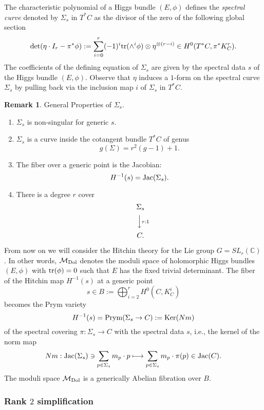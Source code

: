 \documentclass[oneside, 11pt]{amsart}
\theoremstyle{definition}
\newtheorem{rem}[thm]{Remark}
\numberwithin{equation}{subsection}
\def\tr{{\text{\rm{tr}}}}
\def\Ker{{\text{\rm{Ker}}}}
\def\Jac{{\text{\rm{Jac}}}}
\def\Jac{{\text{\rm{Jac}}}}
\def\Prym{{\text{\rm{Prym}}}}
\def\Dol{{\text{\rm{Dol}}}}
\newcommand{\be}{\begin{equation}}
\newcommand{\ee}{\end{equation}}
\newcommand{\rar}{\rightarrow}
\newcommand{\lrar}{\longrightarrow}
\begin{document}
The characteristic polynomial of a Higgs bundle
$(E,\phi)$  defines the \textit{spectral curve}  denoted by $\Sigma_s$ in $T^*C$ as the divisor of the zero of the following
global section
\be \label{spectral}
\det(\eta\cdot I_r-\pi^*\phi):=\sum_{i=0}^r (-1)^i \tr(\wedge^i \phi)\otimes \eta^{\otimes(r-i)}\in H^0(T^*C, \pi^*K_C^r).
\ee
The coefficients of the 
defining equation
of $\Sigma_s$ are given by the spectral data $s$ of the Higgs bundle $(E,\phi)$. Observe that $\eta$ induces a $1$-form on the spectral curve $\Sigma_s$ by pulling back via the inclusion map $i$ of $\Sigma_s$ in $T^*C$.


\begin{rem}
General Properties of $\Sigma_s$.
\begin{enumerate}
\item $\Sigma_s$ is non-singular for generic $s$.
\item
 $\Sigma_s$ is a curve inside the cotangent bundle $T^\ast C$ of genus 
$$g(\Sigma)=r^2(g-1)+1.$$
\item
The fiber over a generic point is the Jacobian:
$$H^{-1}(s)=\Jac(\Sigma_s).$$
\item
There is a degree $r$ cover
$$
\begin{CD}
\;\Sigma_s
\\
@VV{r:1}V
\\
\;C.
\end{CD}
$$

\end{enumerate}
\end{rem}

From now on we will consider the  Hitchin theory for the Lie group $G=SL_{r}(\mathbb{C})$. In other words,  $\mathcal{M}_{\Dol}$ denotes the moduli space of holomorphic Higgs bundles $(E, \phi)$ with $\tr (\phi)=0$ such that $E$ has the fixed trivial determinant. The fiber of the Hitchin map $H^{-1}(s)$ 
at a generic point 
$$s\in B:=\bigoplus_{i=2}^r H^0(C,K_C^i)
$$
becomes the Prym variety 
$$
H^{-1}(s) = \Prym(\Sigma_s\rar C):= \Ker(Nm)
$$
of the spectral covering
 $\pi: \Sigma_s\lrar C$ with the spectral data $s$, i.e., the kernel of the norm map
 $$
 Nm: \Jac(\Sigma_s)\owns \sum_{p\in \Sigma_s}
 m_p\cdot p \longmapsto \sum_{p\in \Sigma_s}
 m_p \cdot \pi(p)\in \Jac(C).
 $$ 
 The moduli space $\mathcal{M}_{\Dol}$ is a generically Abelian fibration over $B$.

\subsubsection{Rank $2$ simplification}\label{rk 2}
\end{document}
